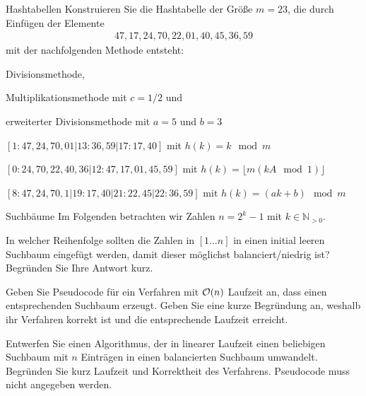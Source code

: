 \documentclass{exercisesheet}
\begin{document}
\begin{eexercises}{Hashtabellen}{
    Konstruieren Sie die Hashtabelle der Größe $m = 23$, die durch Einfügen der Elemente
    \begin{align*}47, 17, 24, 70, 22, 01, 40, 45, 36, 59\end{align*}
    mit der nachfolgenden Methode entsteht:
  }
  \item Divisionsmethode,
  \item Multiplikationsmethode mit $c = 1/2$ und
  \item erweiterter Divisionsmethode mit $a = 5$ und $b = 3$
\end{eexercises}

\begin{solutions}
  \item $[1: 47,24,70,01|13: 36,59|17: 17,40]$ mit $h(k) = k \mod m$
  \item $[0: 24,70,22,40,36|12:47,17,01,45,59]$ mit $h(k) = \lfloor m(kA \mod 1) \rfloor$
  \item $[8: 47,24,70,1|19: 17,40|21: 22,45|22: 36,59]$ mit $h(k) = (ak+b) \mod m$
\end{solutions}

\begin{eexercises}{Suchbäume}{
    Im Folgenden betrachten wir Zahlen $n = 2^k - 1$ mit $k \in \mathbb{N}_{>0}$.
  }
  \item In welcher Reihenfolge sollten die Zahlen in $[1\dots n]$ in einen initial leeren Suchbaum eingefügt werden, damit dieser möglichst balanciert/niedrig ist? Begründen Sie Ihre Antwort kurz.
  \item\label{suchbäume:2} Geben Sie Pseudocode für ein Verfahren mit $\mathcal{O}(n)$ Laufzeit an, dass einen entsprechenden Suchbaum erzeugt. Geben Sie eine kurze Begründung an, weshalb ihr Verfahren korrekt ist und die entsprechende Laufzeit erreicht.
  \item Entwerfen Sie einen Algorithmus, der in linearer Laufzeit einen beliebigen Suchbaum mit $n$ Einträgen in einen balancierten Suchbaum umwandelt. Begründen Sie kurz Laufzeit und Korrektheit des Verfahrens. Pseudocode muss nicht angegeben werden.
\end{eexercises}
\end{document}
